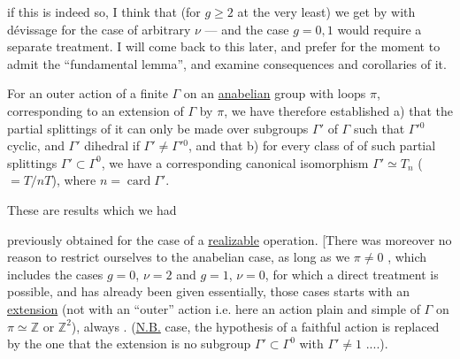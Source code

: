  if this
is indeed so, I think that (for $g\geq2$ at the very
least) we get by with dévissage
for the case of arbitrary $\nu$ --- and the case $g=0,1$
would require  a separate treatment.
I will come back to this later, and
prefer for the moment to admit the ``fundamental
lemma'', and examine consequences
and corollaries of it.

For an outer  action of a finite $\Gamma$
on an \uline{anabelian} group with loops $\pi$, 
 corresponding to an extension  of $\Gamma$ by $\pi$,
we have therefore established a) that the partial
splittings of it can only be made
over  subgroups $\Gamma'$ of $\Gamma$
such that $\Gamma'{}^0$  cyclic, and $\Gamma'$ dihedral
if $\Gamma'\ne\Gamma'{}^0$, and that b) for every class
of  of such partial splittings
 $\Gamma'\subset\Gamma^0$, we have a corresponding canonical
isomorphism $\Gamma'\simeq T_n$ ($=T/nT$), where $n=\operatorname{card}\Gamma'$.

These are results which we had


previously obtained for the case of a
\uline{realizable} operation. [There was moreover no reason
to restrict ourselves to the anabelian case,
as long as we  $\pi\ne0$ ,
which includes the  cases $g=0$, $\nu=2$ and
$g=1$, $\nu=0$, for which a direct treatment
is possible, and has already been given
essentially, those cases  
starts with an \uline{extension} (not with an
``outer'' action i.e. here an action plain and simple
of $\Gamma$ on $\pi\simeq\mathbb Z$ or $\mathbb Z^2$),  always .
(\uline{N.B.}   case, the hypothesis of a
faithful action is replaced by the one that
the extension is    no
subgroup $\Gamma'\subset\Gamma^0$ with $\Gamma'\ne1$ ....).

